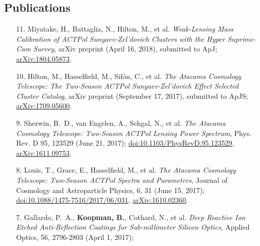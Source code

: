 \documentclass[margin,line]{res}
\begin{document}
\begin{resume}
\section{\sc Publications} 
\begin{enumerate}

\item[{11.}] Miyatake, H., Battaglia, N., Hilton, M., et al.
    \textit{Weak-Lensing Mass Calibration of ACTPol Sunyaev-Zel'dovich Clusters
    with the Hyper Suprime-Cam Survey}, arXiv preprint (April 16, 2018), submitted
    to ApJ; \href{https://arxiv.org/abs/1804.05873}{arXiv:1804.05873}.
\item[{10.}] Hilton, M., Hasselfield, M., Sif{\'o}n, C., et al. \textit{The
    Atacama Cosmology Telescope: The Two-Season ACTPol Sunyaev-Zel'dovich Effect
    Selected Cluster Catalog}, arXiv preprint (September 17, 2017), submitted to ApJS;
    \href{https://arxiv.org/abs/1709.05600}{arXiv:1709.05600}.
\item[{9.}] Sherwin, B.~D., van Engelen, A., Sehgal, N., et al. \textit{The
    Atacama Cosmology Telescope: Two-Season ACTPol Lensing Power Spectrum},
    Phys. Rev. D 95, 123529 (June 21, 2017);
    \href{https://doi.org/10.1103/PhysRevD.95.123529}{doi:10.1103/PhysRevD.95.123529},
    \href{https://arxiv.org/abs/1611.09753}{arXiv:1611.09753}.
\item[{8.}] Louis, T., Grace, E., Hasselfield, M., et al. \textit{The Atacama
    Cosmology Telescope: Two-Season ACTPol Spectra and Parameters},
    Journal of Cosmology and Astroparticle Physics, 6, 31 (June 15, 2017);
    \href{http://dx.doi.org/10.1088/1475-7516/2017/06/031}{doi:10.1088/1475-7516/2017/06/031},
    \href{https://arxiv.org/abs/1610.02360}{arXiv:1610.02360}.
\item[{7.}] Gallardo, P.~A., \textbf{Koopman, B.}, Cothard, N., et al. \textit{Deep
    Reactive Ion Etched Anti-Reflection Coatings for Sub-millimeter Silicon
    Optics}, Applied Optics, 56, 2796-2803 (April 1, 2017);


\end{enumerate}
\end{resume}
\end{document}
